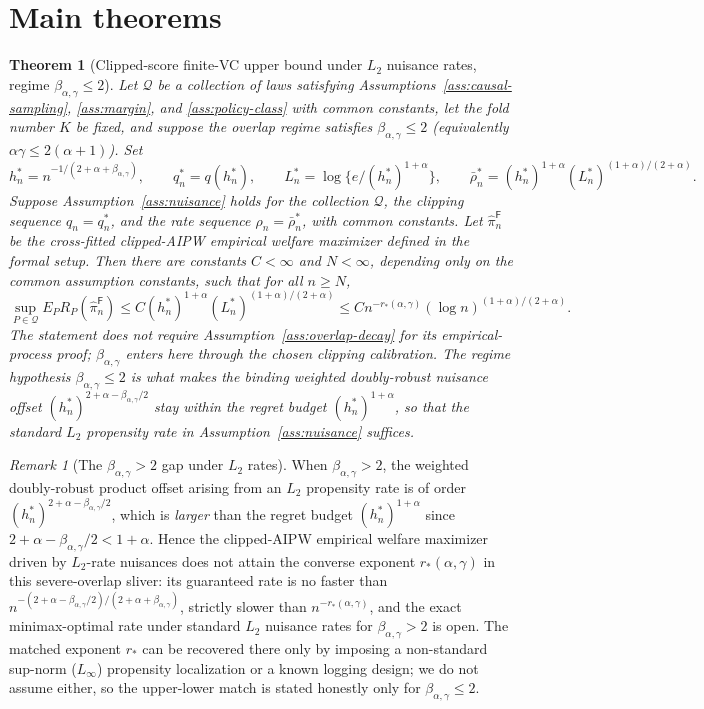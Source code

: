 \documentclass[11pt]{article}
\theoremstyle{definition}
\theoremstyle{plain}
\newtheorem{theorem}{Theorem}
\theoremstyle{remark}
\newtheorem{remark}{Remark}
\begin{document}
\section{Main theorems}
\begin{theorem}[Clipped-score finite-VC upper bound under \(L_2\) nuisance rates, regime \(\beta_{\alpha,\gamma}\le2\)]\label{thm:feasible-upper-log}\label{conj:upper-rate}
Let \(\mathcal Q\) be a collection of laws satisfying
Assumptions~\ref{ass:causal-sampling}, \ref{ass:margin}, and
\ref{ass:policy-class} with common constants, let the fold number \(K\)
be fixed, and suppose the overlap regime satisfies
\(\beta_{\alpha,\gamma}\le2\) (equivalently \(\alpha\gamma\le2(\alpha+1)\)).
Set
\[
h_n^*=n^{-1/(2+\alpha+\beta_{\alpha,\gamma})},
\qquad q_n^*=q(h_n^*),
\qquad
L_n^*=\log\{e/(h_n^*)^{1+\alpha}\},
\qquad
\bar\rho_n^*=(h_n^*)^{1+\alpha}(L_n^*)^{(1+\alpha)/(2+\alpha)}.
\]
Suppose Assumption~\ref{ass:nuisance} holds for the collection
\(\mathcal Q\), the clipping sequence \(q_n=q_n^*\), and the rate sequence
\(\rho_n=\bar\rho_n^*\), with common constants.  Let
\(\widehat\pi_n^{\mathsf F}\) be the cross-fitted clipped-AIPW empirical
welfare maximizer defined in the formal setup.  Then there are constants
\(C<\infty\) and \(N<\infty\), depending only on the common assumption
constants, such that for all \(n\ge N\),
\[
\sup_{P\in\mathcal Q}
E_P R_P(\widehat\pi_n^{\mathsf F})
\le
C (h_n^*)^{1+\alpha}(L_n^*)^{(1+\alpha)/(2+\alpha)}
\le
C n^{-r_*(\alpha,\gamma)}(\log n)^{(1+\alpha)/(2+\alpha)}.
\]
The statement does not require Assumption~\ref{ass:overlap-decay} for its
empirical-process proof; \(\beta_{\alpha,\gamma}\) enters here through the
chosen clipping calibration.  The regime hypothesis
\(\beta_{\alpha,\gamma}\le2\) is what makes the binding weighted
doubly-robust nuisance offset \((h_n^*)^{2+\alpha-\beta_{\alpha,\gamma}/2}\)
stay within the regret budget \((h_n^*)^{1+\alpha}\), so that the standard
\(L_2\) propensity rate in Assumption~\ref{ass:nuisance} suffices.
\end{theorem}

\begin{remark}[The \(\beta_{\alpha,\gamma}>2\) gap under \(L_2\) rates]\label{rem:beta-gt-2-gap}
When \(\beta_{\alpha,\gamma}>2\), the weighted doubly-robust product offset
arising from an \(L_2\) propensity rate is of order
\((h_n^*)^{2+\alpha-\beta_{\alpha,\gamma}/2}\), which is \emph{larger} than the
regret budget \((h_n^*)^{1+\alpha}\) since \(2+\alpha-\beta_{\alpha,\gamma}/2<
1+\alpha\).  Hence the clipped-AIPW empirical welfare maximizer driven by
\(L_2\)-rate nuisances does not attain the converse exponent
\(r_*(\alpha,\gamma)\) in this severe-overlap sliver: its guaranteed rate is
no faster than \(n^{-(2+\alpha-\beta_{\alpha,\gamma}/2)/(2+\alpha+\beta_{\alpha,\gamma})}\),
strictly slower than \(n^{-r_*(\alpha,\gamma)}\), and the exact minimax-optimal
rate under standard \(L_2\) nuisance rates for \(\beta_{\alpha,\gamma}>2\) is
open.  The matched exponent \(r_*\) can be recovered there only by imposing a
non-standard sup-norm (\(L_\infty\)) propensity localization or a known logging
design; we do not assume either, so the upper-lower match is stated honestly
only for \(\beta_{\alpha,\gamma}\le2\).
\end{remark}
\end{document}
